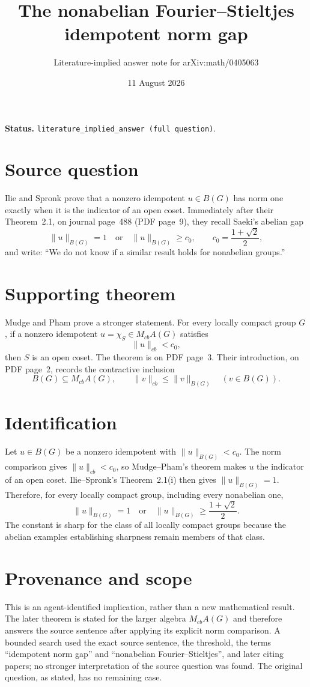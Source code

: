 \documentclass[11pt]{article}
\title{The nonabelian Fourier--Stieltjes idempotent norm gap}
\author{Literature-implied answer note for arXiv:math/0405063}
\date{11 August 2026}
\begin{document}
\maketitle

\noindent\textbf{Status.}
\texttt{literature\_implied\_answer (full question)}.

\section*{Source question}
Ilie and Spronk \cite{IlieSpronk} prove that a nonzero idempotent
$u\in B(G)$ has norm one exactly when it is the indicator of an open coset.
Immediately after their Theorem~2.1, on journal page~488 (PDF page~9), they
recall Saeki's abelian gap
\[
  \|u\|_{B(G)}=1
  \quad\text{or}\quad
  \|u\|_{B(G)}\geq c_0,
  \qquad c_0=\frac{1+\sqrt2}{2},
\]
and write: ``We do not know if a similar result holds for nonabelian groups.''

\section*{Supporting theorem}
Mudge and Pham \cite[Theorem~2.2]{MudgePham} prove a stronger statement.
For every locally compact group $G$, if a nonzero idempotent
$u=\chi_S\in M_{cb}A(G)$ satisfies
\[
  \|u\|_{cb}<c_0,
\]
then $S$ is an open coset.  The theorem is on PDF page~3.  Their introduction,
on PDF page~2, records the contractive inclusion
\[
  B(G)\subseteq M_{cb}A(G),
  \qquad \|v\|_{cb}\leq \|v\|_{B(G)} \quad (v\in B(G)).
\]

\section*{Identification}
Let $u\in B(G)$ be a nonzero idempotent with $\|u\|_{B(G)}<c_0$.
The norm comparison gives $\|u\|_{cb}<c_0$, so Mudge--Pham's theorem makes
$u$ the indicator of an open coset.  Ilie--Spronk's Theorem~2.1(i) then gives
$\|u\|_{B(G)}=1$.  Therefore, for every locally compact group, including every
nonabelian one,
\[
  \boxed{\ \|u\|_{B(G)}=1\quad\text{or}\quad
  \|u\|_{B(G)}\geq\frac{1+\sqrt2}{2}.\ }
\]
The constant is sharp for the class of all locally compact groups because the
abelian examples establishing sharpness remain members of that class.

\section*{Provenance and scope}
This is an agent-identified implication, rather than a new mathematical
result.  The later theorem is stated for the larger algebra $M_{cb}A(G)$ and
therefore answers the source sentence after applying its explicit norm
comparison.  A bounded search used the exact source sentence, the threshold,
the terms ``idempotent norm gap'' and ``nonabelian Fourier--Stieltjes'', and
later citing papers; no stronger interpretation of the source question was
found.  The original question, as stated, has no remaining case.
\end{document}
